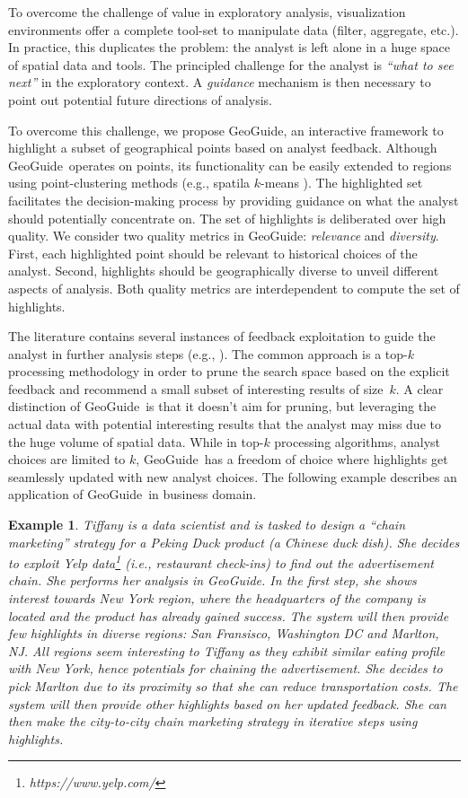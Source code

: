 \documentclass[conference,compsoc]{IEEEtran}
\newtheorem{example}{Example}
\newcommand{\framework}{{\sc GeoGuide}}
\begin{document}
To overcome the challenge of value in exploratory analysis, visualization environments offer a complete tool-set to manipulate data (filter, aggregate, etc.). In practice, this duplicates the problem: the analyst is left alone in a huge space of spatial data and tools. The principled challenge for the analyst is {\em ``what to see next''} in the exploratory context. A {\em guidance} mechanism is then necessary to point out potential future directions of analysis.

To overcome this challenge, we  propose \framework, an interactive framework to highlight a subset of geographical points based on analyst feedback. Although \framework\ operates on points, its functionality can be easily extended to regions using point-clustering methods (e.g., spatila $k$-means \cite{sharma2012k}). The highlighted set facilitates the decision-making process by providing guidance on what the analyst should potentially concentrate on. The set of highlights is deliberated over high quality. We consider two quality metrics in \framework: {\em relevance} and {\em diversity}. First, each highlighted point should be relevant to historical choices of the analyst. Second, highlights should be geographically diverse to unveil different aspects of analysis. Both quality metrics are interdependent to compute the set of highlights.

The literature contains several instances of feedback exploitation to guide the analyst in further analysis steps (e.g., \cite{boley2013one}). The common approach is a top-$k$ processing methodology in order to prune the search space based on the explicit feedback and recommend a small subset of interesting results of size~$k$. A clear distinction of \framework\ is that it doesn't aim for pruning, but leveraging the actual data with potential interesting results that the analyst may miss due to the huge volume of spatial data. While in top-$k$ processing algorithms, analyst choices are limited to $k$, \framework\ has a freedom of choice where highlights get seamlessly updated with new analyst choices. The following example describes an application of \framework\ in business domain.

\begin{example}
\label{ex:flight}
Tiffany is a data scientist and is tasked to design a ``chain marketing'' strategy for a Peking Duck product (a Chinese duck dish). She decides to exploit Yelp data\footnote{\it https://www.yelp.com/} (i.e., restaurant check-ins) to find out the advertisement chain. She performs her analysis in \framework. In the first step, she shows interest towards New York region, where the headquarters of the company is located and the product has already gained success. The system will then provide few highlights in diverse regions: San Fransisco, Washington DC and Marlton, NJ. All regions seem interesting to Tiffany as they exhibit similar eating profile with New York, hence potentials for chaining the advertisement. She decides to pick Marlton due to its proximity so that she can reduce transportation costs. The system will then provide other highlights based on her updated feedback. She can then make the city-to-city chain marketing strategy in iterative steps using highlights.
\end{example}
\end{document}
